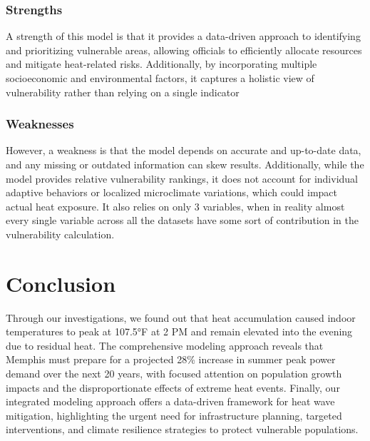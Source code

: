 \documentclass{article}
\begin{document}
\subsubsection*{Strengths}
A strength of this model is that it provides a data-driven approach to identifying and prioritizing vulnerable areas, allowing officials to efficiently allocate resources and mitigate heat-related risks. Additionally, by incorporating multiple socioeconomic and environmental factors, it captures a holistic view of vulnerability rather than relying on a single indicator
\subsubsection*{Weaknesses}
However, a weakness is that the model depends on accurate and up-to-date data, and any missing or outdated information can skew results. Additionally, while the model provides relative vulnerability rankings, it does not account for individual adaptive behaviors or localized microclimate variations, which could impact actual heat exposure. It also relies on only 3 variables, when in reality almost every single variable across all the datasets have some sort of contribution in the vulnerability calculation.

\section*{Conclusion}
Through our investigations, we found out that heat accumulation caused indoor temperatures to peak at 107.5°F at 2 PM and remain elevated into the evening due to residual heat. The comprehensive modeling approach reveals that Memphis must prepare for a projected 28\% increase in summer peak power demand over the next 20 years, with focused attention on population growth impacts and the disproportionate effects of extreme heat events. Finally, our integrated modeling approach offers a data-driven framework for heat wave mitigation, highlighting the urgent need for infrastructure planning, targeted interventions, and climate resilience strategies to protect vulnerable populations.












\clearpage
\end{document}
